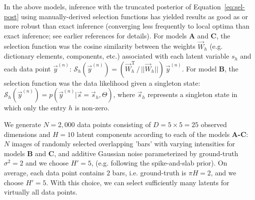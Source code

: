 In the above models, inference with the truncated posterior of Equation~\eqref{eq:sel-post} using manually-derived selection functions has yielded results as good as or more robust than exact inference (converging less frequently to local optima than exact inference; see earlier references for details).
For models \textbf{A} and \textbf{C}, the selection function was the cosine similarity between the weights $\vec{W}_h$ (e.g. dictionary elements, components, etc.) associated with each latent variable $s_h$ and 
each data point $\vec{y}^{(n)}$: 
$  \mathcal{S}_h(\vec{y}^{(n)}) = (\vec{W}_{h}^{\mathrm{T}}\,/\,||\vec{W}_{h}||)\,\vec{y}^{(n)}$.
For model \textbf{B}, the  selection function was the data likelihood given a singleton state:
 $\mathcal{S}_h(\vec{y}^{(n)}) = p(\vec{y}^{(n)} | \vec{s}=\vec{s}_h, \Theta)$, 
%
where $\vec{s}_h$ represents a singleton state in which only the entry $h$ is non-zero.

We generate $N=2,000$ data points consisting of $D=5\times5=25$ observed dimensions and $H=10$ latent components according to each of the models \textbf{A-C}:
$N$ images of randomly selected overlapping 'bars' with varying intensities for models \textbf{B} and \textbf{C}, and additive Gaussian noise parameterized by ground-truth $\sigma^2 = 2$ and we choose $H' = 5$, (e.g. following the spike-and-slab prior). 
On average, each data point contains $2$ bars, i.e. ground-truth is $\pi H = 2$, and we choose $H'=5$. With this choice,
we can select sufficiently many latents for virtually all data points.


